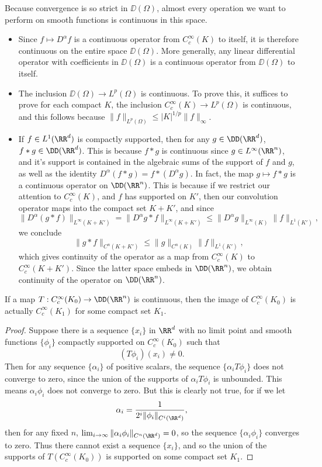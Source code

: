 Because convergence is so strict in $\DD(\Omega)$, almost every operation we want to perform on smooth functions is continuous in this space.
%
\begin{itemize}
    \item Since $f \mapsto D^\alpha f$ is a continuous operator from $C_c^\infty(K)$ to itself, it is therefore continuous on the entire space $\DD(\Omega)$. More generally, any linear differential operator with coefficients in $\DD(\Omega)$ is a continuous operator from $\DD(\Omega)$ to itself.

    \item The inclusion $\DD(\Omega) \to L^p(\Omega)$ is continuous. To prove this, it suffices to prove for each compact $K$, the inclusion $C_c^\infty(K) \to L^p(\Omega)$ is continuous, and this follows because $\| f \|_{L^p(\Omega)} \leq |K|^{1/p} \| f \|_\infty$.

    \item If $f \in L^1(\RR^d)$ is compactly supported, then for any $g \in \DD(\RR^d)$, $f * g \in \DD(\RR^d)$. This is because $f * g$ is continuous since $g \in L^\infty(\RR^n)$, and it's support is contained in the algebraic sums of the support of $f$ and $g$, as well as the identity $D^\alpha(f * g) = f * (D^\alpha g)$. In fact, the map $g \mapsto f * g$ is a continuous operator on $\DD(\RR^n)$. This is because if we restrict our attention to $C_c^\infty(K)$, and $f$ has supported on $K'$, then our convolution operator maps into the compact set $K+K'$, and since
    \[ \| D^\alpha (g * f) \|_{L^\infty(K + K')} = \| D^\alpha g * f \|_{L^\infty(K + K')} \leq \| D^\alpha g \|_{L^\infty(K)} \| f \|_{L^1(K')}, \]
    we conclude
    \[ \| g * f \|_{C^n(K+K')} \leq \| g \|_{C^n(K)} \| f \|_{L^1(K')}, \]
    which gives continuity of the operator as a map from $C_c^\infty(K)$ to $C_c^\infty(K+K')$. Since the latter space embeds in $\DD(\RR^n)$, we obtain continuity of the operator on $\DD(\RR^n)$.
\end{itemize}

\begin{theorem}
    If a map $T: C_c^\infty(K_0) \to \DD(\RR^n)$ is continuous, then the image of $C_c^\infty(K_0)$ is actually $C_c^\infty(K_1)$ for some compact set $K_1$.
\end{theorem}
\begin{proof}
    Suppose there is a sequence $\{ x_i \}$ in $\RR^d$ with no limit point and smooth functions $\{ \phi_i \}$ compactly supported on $C_c^\infty(K_0)$ such that
    \[ (T\phi_i)(x_i) \neq 0. \]
    Then for any sequence $\{ \alpha_i \}$ of positive scalars, the sequence $\{ \alpha_i T\phi_i \}$ does not converge to zero, since the union of the supports of $\alpha_i T\phi_i$ is unbounded. This means $\alpha_i \phi_i$ does not converge to zero. But this is clearly not true, for if we let
    \[ \alpha_i = \frac{1}{2^i \| \phi_i \|_{C^i(\RR^d)}}, \]
    then for any fixed $n$, $\lim_{i \to \infty} \| \alpha_i \phi_i \|_{C^n(\RR^d)} = 0$, so the sequence $\{ \alpha_i \phi_i \}$ converges to zero. Thus there cannot exist a sequence $\{ x_i \}$, and so the union of the supports of $T(C_c^\infty(K_0))$ is supported on some compact set $K_1$.
\end{proof}

